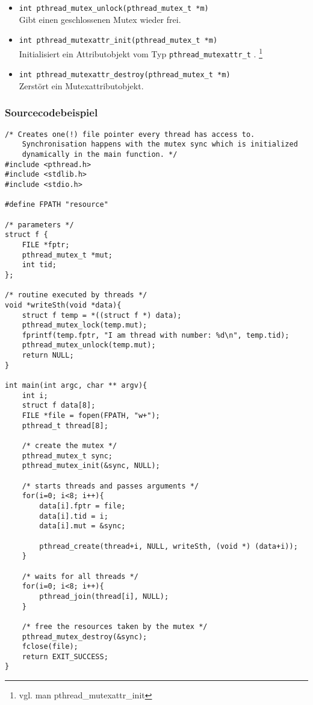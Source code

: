 \documentclass[11pt,a4paper]{article}
\begin{document}
\begin{itemize}
\item \lstinline$int pthread_mutex_unlock(pthread_mutex_t *m)$ \\
Gibt einen geschlossenen Mutex wieder frei.

\item \lstinline$int pthread_mutexattr_init(pthread_mutex_t *m)$ \\
Initialisiert ein Attributobjekt vom Typ \lstinline$pthread_mutexattr_t$ . \footnote{vgl. man pthread\_mutexattr\_init}

\item \lstinline$int pthread_mutexattr_destroy(pthread_mutex_t *m)$ \\
Zerstört ein Mutexattributobjekt.

\end{itemize}

\subsubsection{Sourcecodebeispiel}
\begin{lstlisting}[name=Mutex]
/* Creates one(!) file pointer every thread has access to. 
	Synchronisation happens with the mutex sync which is initialized
	dynamically in the main function. */
#include <pthread.h>
#include <stdlib.h>
#include <stdio.h>

#define FPATH "resource"

/* parameters */
struct f {
	FILE *fptr;
	pthread_mutex_t *mut;
	int tid;
};

/* routine executed by threads */
void *writeSth(void *data){
	struct f temp = *((struct f *) data);
	pthread_mutex_lock(temp.mut);
	fprintf(temp.fptr, "I am thread with number: %d\n", temp.tid);
	pthread_mutex_unlock(temp.mut);
	return NULL;
}

int main(int argc, char ** argv){
	int i;
	struct f data[8];
	FILE *file = fopen(FPATH, "w+");
	pthread_t thread[8];

	/* create the mutex */
	pthread_mutex_t sync; 
	pthread_mutex_init(&sync, NULL);

	/* starts threads and passes arguments */
	for(i=0; i<8; i++){
		data[i].fptr = file;
		data[i].tid = i;
		data[i].mut = &sync;

		pthread_create(thread+i, NULL, writeSth, (void *) (data+i));
	}

	/* waits for all threads */
	for(i=0; i<8; i++){
		pthread_join(thread[i], NULL);
	}

	/* free the resources taken by the mutex */
	pthread_mutex_destroy(&sync);
	fclose(file);
	return EXIT_SUCCESS;
}
\end{lstlisting}
\end{document}
